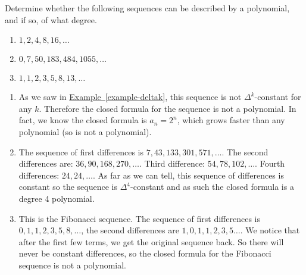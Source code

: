 \documentclass[11pt,]{book}
\theoremstyle{ptxplainnotitle}
\theoremstyle{ptxplaintitle}
\theoremstyle{ptxdefinitionnotitle}
\theoremstyle{ptxdefinitiontitle}
\theoremstyle{ptxdefinitionnotitle}
\theoremstyle{ptxdefinitiontitle}
\theoremstyle{ptxdefinitionnotitle}
\theoremstyle{ptxdefinitiontitle}
\theoremstyle{ptxdefinitiontitlenonumber}
\theoremstyle{ptxdefinitiontitlenonumber}
\numberwithin{equation}{chapter}
\begin{document}
\begin{example}\label{example-17}
\hypertarget{p-363}{}%
Determine whether the following sequences can be described by a polynomial, and if so, of what degree. \leavevmode%
\begin{enumerate}
\item\hypertarget{li-201}{}\(1, 2, 4, 8, 16, \ldots\)%
\item\hypertarget{li-202}{}\(0, 7, 50, 183, 484, 1055, \ldots\)%
\item\hypertarget{li-203}{}\(1,1,2,3,5,8,13,\ldots\)%
\end{enumerate}
%
\par\smallskip%
\noindent\textbf{}\hypertarget{solution-48}{}\hypertarget{p-364}{}%
\leavevmode%
\begin{enumerate}
\item\hypertarget{li-204}{}\hypertarget{p-365}{}%
As we saw in \hyperref[example-deltak]{Example~\ref{example-deltak}}, this sequence is not \(\Delta^k\)-constant for any \(k\). Therefore the closed formula for the sequence is not a polynomial. In fact, we know the closed formula is \(a_n = 2^n\), which grows faster than any polynomial (so is not a polynomial).%
\item\hypertarget{li-205}{}\hypertarget{p-366}{}%
The sequence of first differences is \(7, 43, 133, 301, 571,\ldots\). The second differences are: \(36, 90, 168, 270,\ldots\). Third difference: \(54, 78, 102,\ldots\). Fourth differences: \(24, 24, \ldots\). As far as we can tell, this sequence of differences is constant so the sequence is \(\Delta^4\)-constant and as such the closed formula is a degree 4 polynomial.%
\item\hypertarget{li-206}{}\hypertarget{p-367}{}%
This is the Fibonacci sequence. The sequence of first differences is \(0, 1, 1, 2, 3, 5, 8, \ldots\), the second differences are \(1, 0, 1, 1, 2, 3, 5\ldots\). We notice that after the first few terms, we get the original sequence back. So there will never be constant differences, so the closed formula for the Fibonacci sequence is not a polynomial.%
\end{enumerate}
%
\end{example}
\typeout{************************************************}
\typeout{************************************************}
\end{document}
